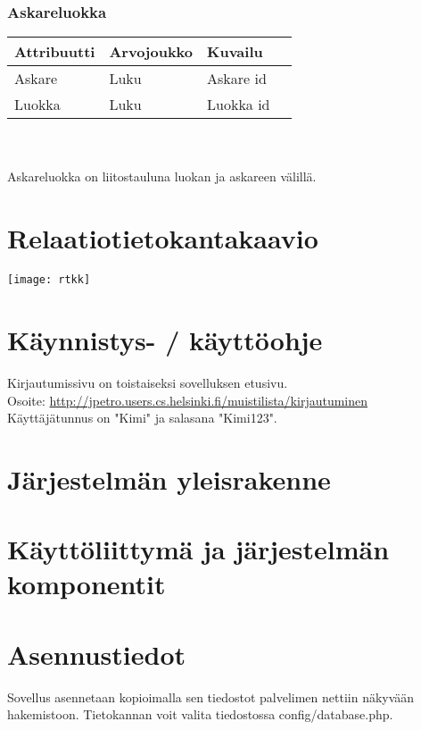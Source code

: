 \documentclass{report}
\begin{document}
\subsubsection*{Askareluokka}
\begin{tabular}{ | l | l | l | p{7.5cm} |} \hline
\textbf{Attribuutti} & \textbf{Arvojoukko} & \textbf{Kuvailu} \\ \hline
Askare & Luku & Askare id \\ \hline
Luokka & Luku & Luokka id \\ \hline
\end{tabular}
\\ \\ Askareluokka on liitostauluna luokan ja askareen välillä.

\section*{Relaatiotietokantakaavio}
\texttt{[image: rtkk]}

\section*{Käynnistys- / käyttöohje}
\noindent Kirjautumissivu on toistaiseksi sovelluksen etusivu. \\ Osoite: \href{http://jpetro.users.cs.helsinki.fi/muistilista/kirjautuminen}{http://jpetro.users.cs.helsinki.fi/muistilista/kirjautuminen} \\
Käyttäjätunnus on "Kimi" ja salasana "Kimi123".

\section*{Järjestelmän yleisrakenne}

\section*{Käyttöliittymä ja järjestelmän komponentit}

\section*{Asennustiedot}
Sovellus asennetaan kopioimalla sen tiedostot palvelimen nettiin näkyvään hakemistoon. Tietokannan voit valita tiedostossa config/database.php.
\end{document}
